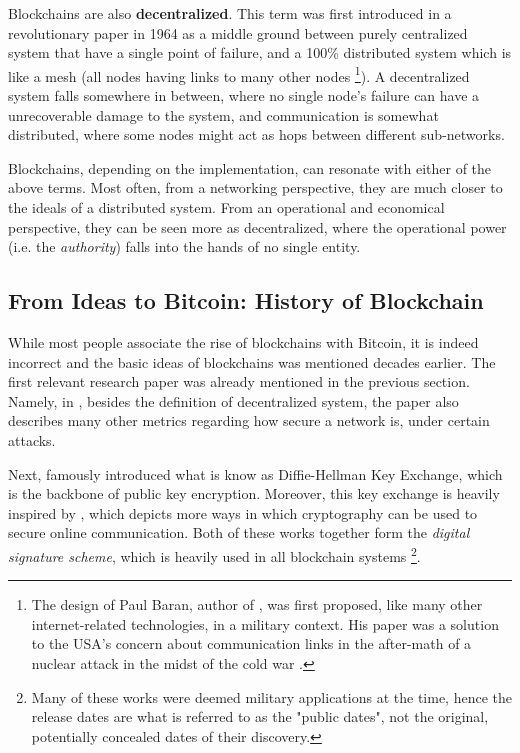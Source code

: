 Blockchains are also \textbf{decentralized}. This term was first introduced in a revolutionary paper
in 1964 as a middle ground between purely centralized system that have a single point of failure,
and a 100\% distributed system which is like a mesh (all nodes having links to many other nodes
\cite{on_distributed_comm_networks_1964} \footnote{The design of Paul Baran, author of
\cite{on_distributed_comm_networks_1964}, was first proposed, like many other internet-related
technologies, in a military context. His paper was a solution to the USA's concern about
communication links in the after-math of a nuclear attack in the midst of the cold war
\cite{paul_baran_cold_war}.}). A decentralized system falls somewhere in between, where no single
node's failure can have a unrecoverable damage to the system, and communication is somewhat
distributed, where some nodes might act as hops between different sub-networks.

Blockchains, depending on the implementation, can resonate with either of the above terms. Most
often, from a networking perspective, they are much closer to the ideals of a distributed system.
From an operational and economical perspective, they can be seen more as decentralized, where the
operational power (i.e. the \textit{authority}) falls into the hands of no single entity.


\subsection{From Ideas to Bitcoin: History of Blockchain} \label{chap_bg_:subsec:hisotry}

While most people associate the rise of blockchains with Bitcoin, it is indeed incorrect and the
basic ideas of blockchains was mentioned decades earlier. The first relevant research paper was
already mentioned in the previous section. Namely, in \cite{on_distributed_comm_networks_1964},
besides the definition of decentralized system, the paper also describes many other metrics
regarding how secure a network is, under certain attacks.

Next, \cite{Diffie_Hellman_1976} famously introduced what is know as Diffie-Hellman Key Exchange,
which is the backbone of public key encryption. Moreover, this key exchange is heavily inspired by
\cite{Merkle_1978}, which depicts more ways in which cryptography can be used to secure online
communication. Both of these works together form the \textit{digital signature scheme}, which is
heavily used in all blockchain systems \footnote{Many of these works were deemed military
applications at the time, hence the release dates are what is referred to as the "public dates", not
the original, potentially concealed dates of their discovery.}.

